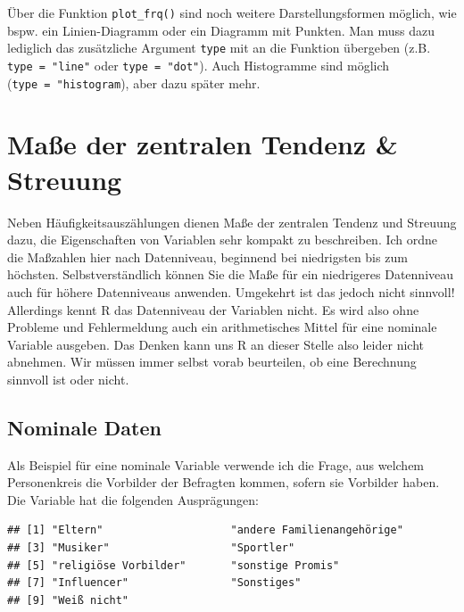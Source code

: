 \documentclass[
]{book}
\newenvironment{Shaded}{\begin{snugshade}}{\end{snugshade}}
\newcommand{\FunctionTok}[1]{\textcolor[rgb]{0.00,0.00,0.00}{#1}}
\newcommand{\NormalTok}[1]{#1}
\newcommand{\SpecialCharTok}[1]{\textcolor[rgb]{0.00,0.00,0.00}{#1}}
\begin{document}
Über die Funktion \texttt{plot\_frq()} sind noch weitere Darstellungsformen möglich, wie bspw. ein Linien-Diagramm oder ein Diagramm mit Punkten. Man muss dazu lediglich das zusätzliche Argument \texttt{type} mit an die Funktion übergeben (z.B. \texttt{type\ =\ "line"} oder \texttt{type\ =\ "dot"}). Auch Histogramme sind möglich (\texttt{type\ =\ "histogram}), aber dazu später mehr.

\hypertarget{mauxdfe-der-zentralen-tendenz-streuung}{%
\section{Maße der zentralen Tendenz \& Streuung}\label{mauxdfe-der-zentralen-tendenz-streuung}}

Neben Häufigkeitsauszählungen dienen Maße der zentralen Tendenz und Streuung dazu, die Eigenschaften von Variablen sehr kompakt zu beschreiben. Ich ordne die Maßzahlen hier nach Datenniveau, beginnend bei niedrigsten bis zum höchsten. Selbstverständlich können Sie die Maße für ein niedrigeres Datenniveau auch für höhere Datenniveaus anwenden. Umgekehrt ist das jedoch nicht sinnvoll! Allerdings kennt R das Datenniveau der Variablen nicht. Es wird also ohne Probleme und Fehlermeldung auch ein arithmetisches Mittel für eine nominale Variable ausgeben. Das Denken kann uns R an dieser Stelle also leider nicht abnehmen. Wir müssen immer selbst vorab beurteilen, ob eine Berechnung sinnvoll ist oder nicht.

\hypertarget{nominale-daten}{%
\subsection{Nominale Daten}\label{nominale-daten}}

Als Beispiel für eine nominale Variable verwende ich die Frage, aus welchem Personenkreis die Vorbilder der Befragten kommen, sofern sie Vorbilder haben. Die Variable hat die folgenden Ausprägungen:

\begin{Shaded}
\end{Shaded}

\begin{verbatim}
## [1] "Eltern"                    "andere Familienangehörige"
## [3] "Musiker"                   "Sportler"                 
## [5] "religiöse Vorbilder"       "sonstige Promis"          
## [7] "Influencer"                "Sonstiges"                
## [9] "Weiß nicht"
\end{verbatim}
\end{document}
